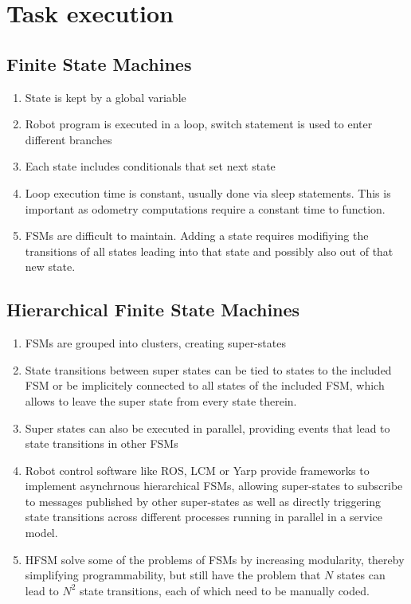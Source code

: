 \chapter{Task execution}

\section{Finite State Machines}

\begin{enumerate}
\item State is kept by a global variable
\item Robot program is executed in a loop, switch statement is used to enter different branches
\item Each state includes conditionals that set next state
\item Loop execution time is constant, usually done via sleep statements. This is important as odometry computations require a constant time to function.
\item FSMs are difficult to maintain. Adding a state requires modifiying the transitions of all states leading into that state and possibly also out of that new state.
\end{enumerate}

\section{Hierarchical Finite State Machines}
\begin{enumerate}
\item FSMs are grouped into clusters, creating super-states
\item State transitions between super states can be tied to states to the included FSM or be implicitely connected to all states of the included FSM, which allows to leave the super state from every state therein. 
\item Super states can also be executed in parallel, providing  events that lead to state transitions in other FSMs
\item Robot control software like ROS, LCM or Yarp provide frameworks to implement asynchrnous hierarchical FSMs, allowing super-states to subscribe to messages published by other super-states as well as directly triggering state transitions across different processes running in parallel in a service model.
\item HFSM solve some of the problems of FSMs by increasing modularity, thereby simplifying programmability, but still have the problem that $N$ states can lead to $N^2$ state transitions, each of which need to be manually coded.
\end{enumerate}

